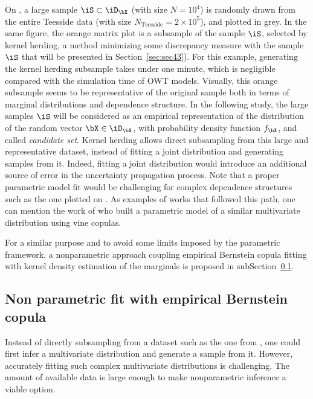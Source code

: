 On , a large sample $\iS \subset \iD_{\bX}$ (with size $N=10^4$) is randomly drawn from the entire Teesside data (with size $N_{\mathrm{Teesside}} = 2\times 10^5$), and plotted in grey. 
In the same figure, the orange matrix plot is a subsample of the sample $\iS$, selected by kernel herding, a method minimizing some discrepancy measure with the sample $\iS$ that will be presented in Section~\ref{sec:sec43}). 
For this example, generating the kernel herding subsample takes under one minute, which is negligible compared with the simulation time of OWT models. 
Visually, this orange subsample seems to be representative of the original sample both in terms of marginal distributions and dependence structure. 
In the following study, the large samples $\iS$ will be considered as an empirical representation of the distribution of the random vector $\bX \in \iD_{\bX}$, with probability density function $f_{\bX}$, and called \textit{candidate set}. 
Kernel herding allows direct subsampling from this large and representative dataset, instead of fitting a joint distribution and generating samples from it.
Indeed, fitting a joint distribution would introduce an additional source of error in the uncertainty propagation process.
Note that a proper parametric model fit would be challenging for complex dependence structures such as the one plotted on . 
As examples of works that followed this path, one can mention the work of \citet{li_zhan_2020} who built a parametric model of a similar multivariate distribution using vine copulas. 

For a similar purpose and to avoid some limits imposed by the parametric framework, a nonparametric approach coupling empirical Bernstein copula fitting with kernel density estimation of the marginals is proposed in subSection~\ref{sec:4ebc}.


\subsection{Non parametric fit with empirical Bernstein copula}\label{sec:4ebc}
Instead of directly subsampling from a dataset such as the one from , one could first infer a multivariate distribution and generate a sample from it. 
However, accurately fitting such complex multivariate distributions is challenging. 
The amount of available data is large enough to make nonparametric inference a viable option.

